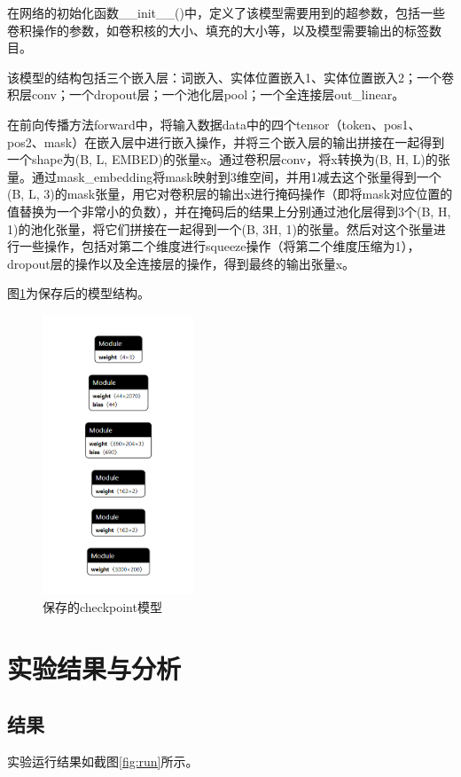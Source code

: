 \documentclass{report}
\begin{document}
	在网络的初始化函数\_\_init\_\_()中，定义了该模型需要用到的超参数，包括一些卷积操作的参数，如卷积核的大小、填充的大小等，以及模型需要输出的标签数目。
	
	该模型的结构包括三个嵌入层：词嵌入、实体位置嵌入1、实体位置嵌入2；一个卷积层conv；一个dropout层；一个池化层pool；一个全连接层out\_linear。
	
	在前向传播方法forward中，将输入数据data中的四个tensor（token、pos1、pos2、mask）在嵌入层中进行嵌入操作，并将三个嵌入层的输出拼接在一起得到一个shape为(B, L, EMBED)的张量x。通过卷积层conv，将x转换为(B, H, L)的张量。通过mask\_embedding将mask映射到3维空间，并用1减去这个张量得到一个(B, L, 3)的mask张量，用它对卷积层的输出x进行掩码操作（即将mask对应位置的值替换为一个非常小的负数），并在掩码后的结果上分别通过池化层得到3个(B, H, 1)的池化张量，将它们拼接在一起得到一个(B, 3H, 1)的张量。然后对这个张量进行一些操作，包括对第二个维度进行squeeze操作（将第二个维度压缩为1），dropout层的操作以及全连接层的操作，得到最终的输出张量x。
	
	图\ref{fig:ckpt}为保存后的模型结构。
	
	\begin{figure}[htbp]
		\centering
		\includegraphics[width=0.4\textwidth]{fig/ckpt.png}
		\caption{保存的checkpoint模型}
		\label{fig:ckpt}
	\end{figure}
	
	
	\chapter{实验结果与分析}
	\section{结果}
	实验运行结果如截图\ref{fig:run}所示。
	
\end{document}
